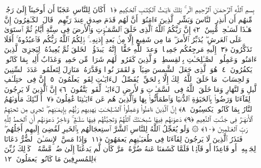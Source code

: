
  
    
  
    
    

\nopagebreak
  بِسمِ ٱللَّهِ ٱلرَّحمَـٰنِ ٱلرَّحِيمِ
  الٓر ۚ تِلكَ ءَايَـٰتُ ٱلكِتَـٰبِ ٱلحَكِيمِ ﴿١﴾
 أَكَانَ لِلنَّاسِ عَجَبًا أَن أَوحَينَآ إِلَىٰ رَجُلٍۢ مِّنهُم أَن أَنذِرِ ٱلنَّاسَ وَبَشِّرِ ٱلَّذِينَ ءَامَنُوٓا۟ أَنَّ لَهُم قَدَمَ صِدقٍ عِندَ رَبِّهِم ۗ قَالَ ٱلكَـٰفِرُونَ إِنَّ هَـٰذَا لَسَـٰحِرٌۭ مُّبِينٌ ﴿٢﴾
 إِنَّ رَبَّكُمُ ٱللَّهُ ٱلَّذِى خَلَقَ ٱلسَّمَـٰوَٟتِ وَٱلأَرضَ فِى سِتَّةِ أَيَّامٍۢ ثُمَّ ٱستَوَىٰ عَلَى ٱلعَرشِ ۖ يُدَبِّرُ ٱلأَمرَ ۖ مَا مِن شَفِيعٍ إِلَّا مِنۢ بَعدِ إِذنِهِۦ ۚ ذَٟلِكُمُ ٱللَّهُ رَبُّكُم فَٱعبُدُوهُ ۚ أَفَلَا تَذَكَّرُونَ ﴿٣﴾
 إِلَيهِ مَرجِعُكُم جَمِيعًۭا ۖ وَعدَ ٱللَّهِ حَقًّا ۚ إِنَّهُۥ يَبدَؤُا۟ ٱلخَلقَ ثُمَّ يُعِيدُهُۥ لِيَجزِىَ ٱلَّذِينَ ءَامَنُوا۟ وَعَمِلُوا۟ ٱلصَّـٰلِحَـٰتِ بِٱلقِسطِ ۚ وَٱلَّذِينَ كَفَرُوا۟ لَهُم شَرَابٌۭ مِّن حَمِيمٍۢ وَعَذَابٌ أَلِيمٌۢ بِمَا كَانُوا۟ يَكفُرُونَ ﴿٤﴾
 هُوَ ٱلَّذِى جَعَلَ ٱلشَّمسَ ضِيَآءًۭ وَٱلقَمَرَ نُورًۭا وَقَدَّرَهُۥ مَنَازِلَ لِتَعلَمُوا۟ عَدَدَ ٱلسِّنِينَ وَٱلحِسَابَ ۚ مَا خَلَقَ ٱللَّهُ ذَٟلِكَ إِلَّا بِٱلحَقِّ ۚ يُفَصِّلُ ٱلءَايَـٰتِ لِقَومٍۢ يَعلَمُونَ ﴿٥﴾
 إِنَّ فِى ٱختِلَـٰفِ ٱلَّيلِ وَٱلنَّهَارِ وَمَا خَلَقَ ٱللَّهُ فِى ٱلسَّمَـٰوَٟتِ وَٱلأَرضِ لَءَايَـٰتٍۢ لِّقَومٍۢ يَتَّقُونَ ﴿٦﴾
 إِنَّ ٱلَّذِينَ لَا يَرجُونَ لِقَآءَنَا وَرَضُوا۟ بِٱلحَيَوٰةِ ٱلدُّنيَا وَٱطمَأَنُّوا۟ بِهَا وَٱلَّذِينَ هُم عَن ءَايَـٰتِنَا غَٰفِلُونَ ﴿٧﴾
 أُو۟لَـٰٓئِكَ مَأوَىٰهُمُ ٱلنَّارُ بِمَا كَانُوا۟ يَكسِبُونَ ﴿٨﴾
 إِنَّ ٱلَّذِينَ ءَامَنُوا۟ وَعَمِلُوا۟ ٱلصَّـٰلِحَـٰتِ يَهدِيهِم رَبُّهُم بِإِيمَـٰنِهِم ۖ تَجرِى مِن تَحتِهِمُ ٱلأَنهَـٰرُ فِى جَنَّـٰتِ ٱلنَّعِيمِ ﴿٩﴾
 دَعوَىٰهُم فِيهَا سُبحَـٰنَكَ ٱللَّهُمَّ وَتَحِيَّتُهُم فِيهَا سَلَـٰمٌۭ ۚ وَءَاخِرُ دَعوَىٰهُم أَنِ ٱلحَمدُ لِلَّهِ رَبِّ ٱلعَـٰلَمِينَ ﴿١٠﴾
 ۞ وَلَو يُعَجِّلُ ٱللَّهُ لِلنَّاسِ ٱلشَّرَّ ٱستِعجَالَهُم بِٱلخَيرِ لَقُضِىَ إِلَيهِم أَجَلُهُم ۖ فَنَذَرُ ٱلَّذِينَ لَا يَرجُونَ لِقَآءَنَا فِى طُغيَـٰنِهِم يَعمَهُونَ ﴿١١﴾
 وَإِذَا مَسَّ ٱلإِنسَـٰنَ ٱلضُّرُّ دَعَانَا لِجَنۢبِهِۦٓ أَو قَاعِدًا أَو قَآئِمًۭا فَلَمَّا كَشَفنَا عَنهُ ضُرَّهُۥ مَرَّ كَأَن لَّم يَدعُنَآ إِلَىٰ ضُرٍّۢ مَّسَّهُۥ ۚ كَذَٟلِكَ زُيِّنَ لِلمُسرِفِينَ مَا كَانُوا۟ يَعمَلُونَ ﴿١٢﴾
